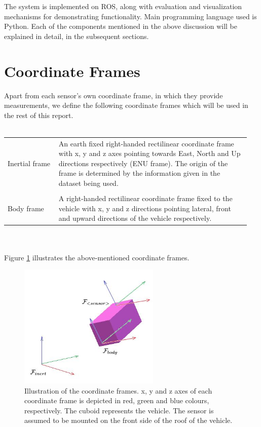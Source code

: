 The system is implemented on \gls{ROS}, along with evaluation and visualization mechanisms for demonstrating functionality. Main programming language used is Python. Each of the components mentioned in the above discussion will be explained in detail, in the subsequent sections.







\section{Coordinate Frames}
Apart from each sensor's own coordinate frame, in which they provide measurements, we define the following coordinate frames which will be used in the rest of this report.\\\\
\begin{tabular}{p{0.2\linewidth} p{0.75\linewidth} } 
	Inertial frame & An earth fixed right-handed rectilinear coordinate frame with x, y and z axes pointing towards East, North and Up directions respectively (ENU frame). The origin of the frame is determined by the information given in the dataset being used.\\\\
	Body frame & A right-handed rectilinear coordinate frame fixed to the vehicle with x, y and z directions pointing lateral, front and upward directions of the vehicle respectively.
\end{tabular}\\\\
Figure \ref{fig:pa:coordinateFrames} illustrates the above-mentioned coordinate frames.
\begin{figure}[htp]
	\begin{center}
	\includegraphics[width=0.6\textwidth]{figs/coordinate-frames.jpg}
	\end{center}
	\vspace{-0.5cm}
	\caption[Coordinate frames]{Illustration of the coordinate frames. x, y and z axes of each coordinate frame is depicted in red, green and blue colours, respectively. The cuboid represents the vehicle. The sensor is assumed to be mounted on the front side of the roof of the vehicle.}
	\label{fig:pa:coordinateFrames}
	\vspace{0.5cm}
\end{figure}







